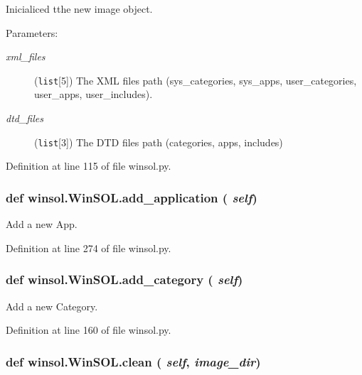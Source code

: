 Inicialiced tthe new image object. 

\begin{Desc}
\item[Parameters:]
\begin{description}
\item[{\em xml\_\-files}]({\tt list}\mbox{[}5\mbox{]}) The XML files path (sys\_\-categories, sys\_\-apps, user\_\-categories, user\_\-apps, user\_\-includes). \item[{\em dtd\_\-files}]({\tt list}\mbox{[}3\mbox{]}) The DTD files path (categories, apps, includes) \end{description}
\end{Desc}


Definition at line 115 of file winsol.py.\hypertarget{classwinsol_1_1WinSOL_5e1be4178d5800b698685f34c55028d4}{
\subsubsection[add\_\-application]{\setlength{\rightskip}{0pt plus 5cm}def winsol.Win\-SOL.add\_\-application ( {\em self})}}
\label{classwinsol_1_1WinSOL_5e1be4178d5800b698685f34c55028d4}


Add a new App. 



Definition at line 274 of file winsol.py.\hypertarget{classwinsol_1_1WinSOL_4a0f8763ed2d6bae963048e7329398f4}{
\subsubsection[add\_\-category]{\setlength{\rightskip}{0pt plus 5cm}def winsol.Win\-SOL.add\_\-category ( {\em self})}}
\label{classwinsol_1_1WinSOL_4a0f8763ed2d6bae963048e7329398f4}


Add a new Category. 



Definition at line 160 of file winsol.py.\hypertarget{classwinsol_1_1WinSOL_89a40fdffa62401f36b6cc273224dea2}{
\subsubsection[clean]{\setlength{\rightskip}{0pt plus 5cm}def winsol.Win\-SOL.clean ( {\em self},  {\em image\_\-dir})}}
\label{classwinsol_1_1WinSOL_89a40fdffa62401f36b6cc273224dea2}


